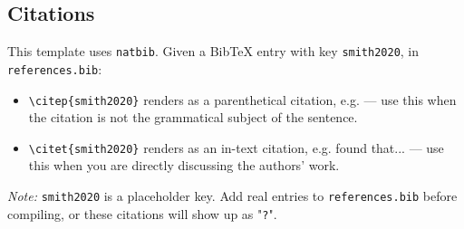 \documentclass[11pt, a4paper]{article}
\begin{document}
\subsection{Citations}
This template uses \texttt{natbib}. Given a BibTeX entry with key \texttt{smith2020}, in \texttt{references.bib}:

\begin{itemize}
    \item \texttt{\textbackslash citep\{smith2020\}} renders as a parenthetical citation, e.g. \citep{smith2020} — use this when the citation is not the grammatical subject of the sentence.
    \item \texttt{\textbackslash citet\{smith2020\}} renders as an in-text citation, e.g. \citet{smith2020} found that... — use this when you are directly discussing the authors' work.
\end{itemize}

\noindent\textit{Note:} \texttt{smith2020} is a placeholder key. Add real entries to \texttt{references.bib} before compiling, or these citations will show up as "\texttt{?}".
\end{document}
